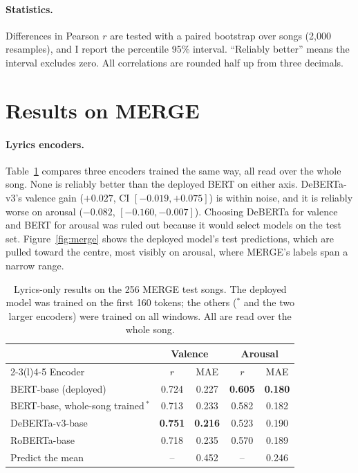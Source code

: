 \documentclass[10pt,twocolumn]{article}
\begin{document}
\paragraph{Statistics.} Differences in Pearson $r$ are tested with a paired bootstrap over songs (2,000 resamples), and I report the percentile 95\% interval. ``Reliably better'' means the interval excludes zero. All correlations are rounded half up from three decimals.

\section{Results on MERGE}
\label{sec:merge}

\paragraph{Lyrics encoders.} Table~\ref{tab:encoders} compares three encoders trained the same way, all read over the whole song. None is reliably better than the deployed BERT on either axis. DeBERTa-v3's valence gain ($+0.027$, CI $[-0.019,+0.075]$) is within noise, and it is reliably worse on arousal ($-0.082$, $[-0.160,-0.007]$). Choosing DeBERTa for valence and BERT for arousal was ruled out because it would select models on the test set. Figure~\ref{fig:merge} shows the deployed model's test predictions, which are pulled toward the centre, most visibly on arousal, where MERGE's labels span a narrow range.

\begin{table}[t]
\centering\footnotesize
\setlength{\tabcolsep}{3pt}
\begin{tabular}{@{}lcccc@{}}
\toprule
& \multicolumn{2}{c}{Valence} & \multicolumn{2}{c}{Arousal}\\
\cmidrule(lr){2-3}\cmidrule(l){4-5}
Encoder & $r$ & MAE & $r$ & MAE \\
\midrule
BERT-base (deployed) & 0.724 & 0.227 & \textbf{0.605} & \textbf{0.180}\\
BERT-base, whole-song trained\,$^*$ & 0.713 & 0.233 & 0.582 & 0.182\\
DeBERTa-v3-base & \textbf{0.751} & \textbf{0.216} & 0.523 & 0.190\\
RoBERTa-base & 0.718 & 0.235 & 0.570 & 0.189\\
Predict the mean & -- & 0.452 & -- & 0.246\\
\bottomrule
\end{tabular}
\caption{Lyrics-only results on the 256 MERGE test songs. The deployed model was trained on the first 160 tokens; the others ($^*$ and the two larger encoders) were trained on all windows. All are read over the whole song.}
\label{tab:encoders}
\end{table}
\end{document}
